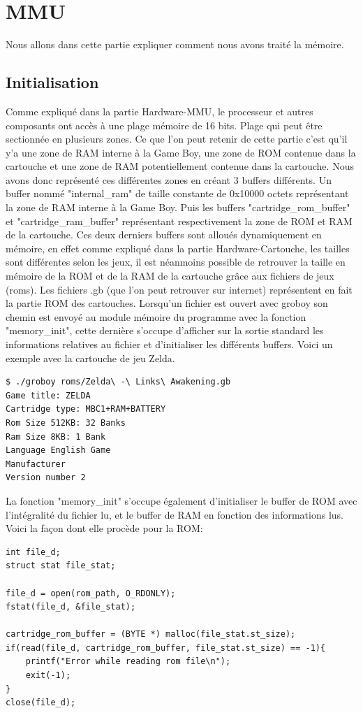 \documentclass{report}
\begin{document}
\section{MMU}
Nous allons dans cette partie expliquer comment nous avons traité la mémoire. 
\subsection{Initialisation} 
Comme expliqué dans la partie Hardware-MMU, le processeur et autres composants ont accès à une plage mémoire de 16 bits. Plage qui peut être sectionnée en plusieurs zones. Ce que l'on peut retenir de cette partie c'est qu'il y'a une zone de RAM interne à la Game Boy, une zone de ROM contenue dans la cartouche et une zone de RAM potentiellement contenue dans la cartouche. Nous avons donc représenté ces différentes zones en créant 3 buffers différents. Un buffer nommé "internal\_ram" de taille constante de 0x10000 octets représentant la zone de RAM interne à la Game Boy. Puis les buffers "cartridge\_rom\_buffer" et "cartridge\_ram\_buffer" représentant respectivement la zone de ROM et RAM de la cartouche.
Ces deux derniers buffers sont alloués dynamiquement en mémoire, en effet comme expliqué dans la partie Hardware-Cartouche, les tailles sont différentes selon les jeux, il est néanmoins possible de retrouver la taille en mémoire de la ROM et de la RAM de la cartouche grâce aux fichiers de jeux (roms).
Les fichiers .gb (que l'on peut retrouver sur internet) représentent en fait la partie ROM des cartouches.
Lorsqu'un fichier est ouvert avec groboy son chemin est envoyé au module mémoire du programme avec la fonction "memory\_init", cette dernière s'occupe d'afficher sur la sortie standard les informations relatives au fichier et d'initialiser les différents buffers. Voici un exemple avec la cartouche de jeu Zelda.
\begin{lstlisting}
$ ./groboy roms/Zelda\ -\ Links\ Awakening.gb
Game title: ZELDA
Cartridge type: MBC1+RAM+BATTERY
Rom Size 512KB: 32 Banks
Ram Size 8KB: 1 Bank
Language English Game
Manufacturer
Version number 2
\end{lstlisting}
La fonction "memory\_init" s'occupe également d'initialiser le buffer de ROM avec l'intégralité du fichier lu, et le buffer de RAM en fonction des informations lus.
Voici la façon dont elle procède pour la ROM:
\begin{lstlisting}
int file_d;
struct stat file_stat;

file_d = open(rom_path, O_RDONLY);
fstat(file_d, &file_stat);

cartridge_rom_buffer = (BYTE *) malloc(file_stat.st_size);
if(read(file_d, cartridge_rom_buffer, file_stat.st_size) == -1){
	printf("Error while reading rom file\n");
	exit(-1);
}    
close(file_d);
\end{lstlisting}
\end{document}
